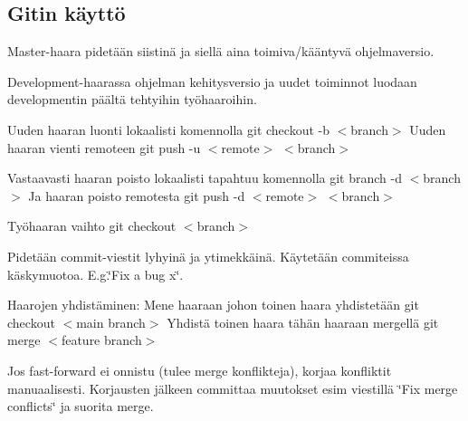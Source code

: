 \subsection*{Gitin käyttö}

Master-\/haara pidetään siistinä ja siellä aina toimiva/kääntyvä ohjelmaversio.

Development-\/haarassa ohjelman kehitysversio ja uudet toiminnot luodaan developmentin päältä tehtyihin työhaaroihin.

Uuden haaran luonti lokaalisti komennolla {\ttfamily git checkout -\/b $<$branch$>$} Uuden haaran vienti remoteen {\ttfamily git push -\/u $<$remote$>$ $<$branch$>$}

Vastaavasti haaran poisto lokaalisti tapahtuu komennolla {\ttfamily git branch -\/d $<$branch$>$} Ja haaran poisto remotesta {\ttfamily git push -\/d $<$remote$>$ $<$branch$>$}

Työhaaran vaihto {\ttfamily git checkout $<$branch$>$}

Pidetään commit-\/viestit lyhyinä ja ytimekkäinä. Käytetään commiteissa käskymuotoa. E.\-g.\char`\"{}\-Fix a bug x\char`\"{}.

Haarojen yhdistäminen\-: Mene haaraan johon toinen haara yhdistetään {\ttfamily git checkout $<$main branch$>$} Yhdistä toinen haara tähän haaraan mergellä {\ttfamily git merge $<$feature branch$>$}

Jos fast-\/forward ei onnistu (tulee merge konflikteja), korjaa konfliktit manuaalisesti. Korjausten jälkeen committaa muutokset esim viestillä \char`\"{}\-Fix merge conflicts\char`\"{} ja suorita merge. 